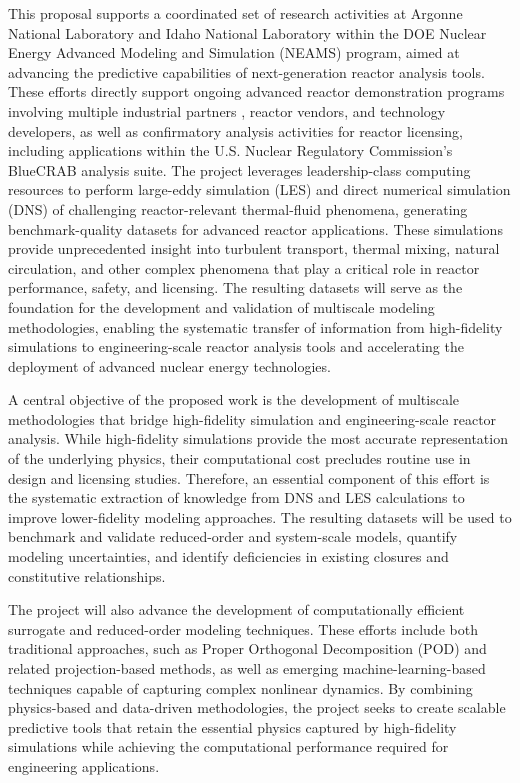 This proposal supports a coordinated set of research activities at Argonne National Laboratory and Idaho National Laboratory within the DOE Nuclear Energy Advanced Modeling and Simulation (NEAMS) program, aimed at advancing the predictive capabilities of next-generation reactor analysis tools. These efforts directly support ongoing advanced reactor demonstration programs involving multiple industrial partners \cite{merzari2025building}, reactor vendors, and technology developers, as well as confirmatory analysis activities for reactor licensing, including applications within the U.S. Nuclear Regulatory Commission's BlueCRAB analysis suite. The project leverages leadership-class computing resources to perform large-eddy simulation (LES) and direct numerical simulation (DNS) of challenging reactor-relevant thermal-fluid phenomena, generating benchmark-quality datasets for advanced reactor applications. These simulations provide unprecedented insight into turbulent transport, thermal mixing, natural circulation, and other complex phenomena that play a critical role in reactor performance, safety, and licensing. The resulting datasets will serve as the foundation for the development and validation of multiscale modeling methodologies, enabling the systematic transfer of information from high-fidelity simulations to engineering-scale reactor analysis tools and accelerating the deployment of advanced nuclear energy technologies.

A central objective of the proposed work is the development of multiscale methodologies that bridge high-fidelity simulation and engineering-scale reactor analysis. While high-fidelity simulations provide the most accurate representation of the underlying physics, their computational cost precludes routine use in design and licensing studies. Therefore, an essential component of this effort is the systematic extraction of knowledge from DNS and LES calculations to improve lower-fidelity modeling approaches. The resulting datasets will be used to benchmark and validate reduced-order and system-scale models, quantify modeling uncertainties, and identify deficiencies in existing closures and constitutive relationships.

The project will also advance the development of computationally efficient surrogate and reduced-order modeling techniques. These efforts include both traditional approaches, such as Proper Orthogonal Decomposition (POD) and related projection-based methods, as well as emerging machine-learning-based techniques capable of capturing complex nonlinear dynamics. By combining physics-based and data-driven methodologies, the project seeks to create scalable predictive tools that retain the essential physics captured by high-fidelity simulations while achieving the computational performance required for engineering applications.

